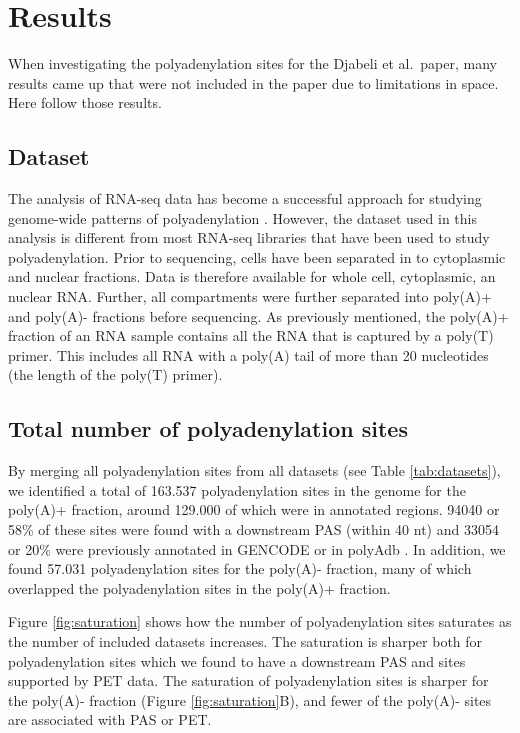 \section{Results}
When investigating the polyadenylation sites for the Djabeli et al.\ paper,
many results came up that were not included in the paper due to limitations in
space. Here follow those results.

\subsection{Dataset}
The analysis of RNA-seq data has become a successful approach for studying
genome-wide patterns of polyadenylation \cite{shepard_complex_2011,
ozsolak_comprehensive_2010}. However, the dataset used in this analysis is
different from most RNA-seq libraries that have been used to study
polyadenylation. Prior to sequencing, cells have been separated in to
cytoplasmic and nuclear fractions. Data is therefore available for whole cell,
cytoplasmic, an nuclear RNA. Further, all compartments were further separated
into poly(A)+ and poly(A)- fractions before sequencing. As previously
mentioned, the poly(A)+ fraction of an RNA sample contains all the RNA that is
captured by a poly(T) primer. This includes all RNA with a poly(A) tail of more
than 20 nucleotides (the length of the poly(T) primer).

\subsection{Total number of polyadenylation sites}
By merging all polyadenylation sites from all datasets (see Table
\ref{tab:datasets}), we identified a total of 163.537 polyadenylation sites in
the genome for the poly(A)+ fraction, around 129.000 of which were in annotated
regions. 94040 or 58\% of these sites were found with a downstream PAS (within
40 nt) and 33054 or 20\% were previously annotated in GENCODE or in polyAdb
\cite{lee_polya_db_2007}. In addition, we found 57.031 polyadenylation sites
for the poly(A)- fraction, many of which overlapped the polyadenylation sites
in the poly(A)+ fraction.

Figure \ref{fig:saturation} shows how the number of polyadenylation sites
saturates as the number of included datasets increases. The saturation is
sharper both for polyadenylation sites which we found to have a downstream
PAS and sites supported by PET data. The saturation of polyadenylation sites is
sharper for the poly(A)- fraction (Figure \ref{fig:saturation}B), and fewer of
the poly(A)- sites are associated with PAS or PET.


